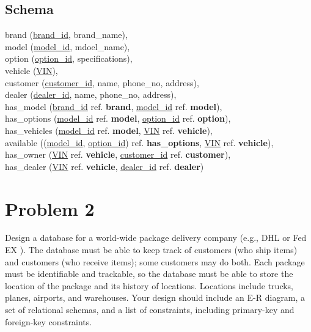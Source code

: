 \documentclass{article}
\begin{document}
\subsection{Schema}
\onehalfspacing
\begin{center}
  brand (\underline{brand\_id}, brand\_name), \\
  model (\underline{model\_id}, mdoel\_name), \\
  option (\underline{option\_id}, specifications), \\
  vehicle (\underline{VIN}), \\
  customer (\underline{customer\_id}, name, phone\_no, address), \\
  dealer (\underline{dealer\_id}, name, phone\_no, address), \\
  has\_model (\underline{brand\_id} ref. \textbf{brand}, \underline{model\_id} ref. \textbf{model}), \\
  has\_options (\underline{model\_id} ref. \textbf{model}, \underline{option\_id} ref. \textbf{option}), \\
  has\_vehicles (\underline{model\_id} ref. \textbf{model}, \underline{VIN} ref. \textbf{vehicle}), \\
  available ((\underline{model\_id}, \underline{option\_id}) ref. \textbf{has\_options}, \underline{VIN} ref. \textbf{vehicle}), \\
  has\_owner (\underline{VIN} ref. \textbf{vehicle}, \underline{customer\_id} ref. \textbf{customer}), \\
  has\_dealer (\underline{VIN} ref. \textbf{vehicle}, \underline{dealer\_id} ref. \textbf{dealer}) \\
\end{center}

\section{Problem 2}
Design a database for a world-wide package delivery company (e.g., DHL or Fed EX ). The database
must be able to keep track of customers (who ship items) and customers (who receive items); some
customers may do both. Each package must be identifiable and trackable, so the database must be able to
store the location of the package and its history of locations.
Locations include trucks, planes, airports, and warehouses. Your design should include an E-R diagram, a
set of relational schemas, and a list of constraints, including primary-key and foreign-key constraints.
\end{document}
